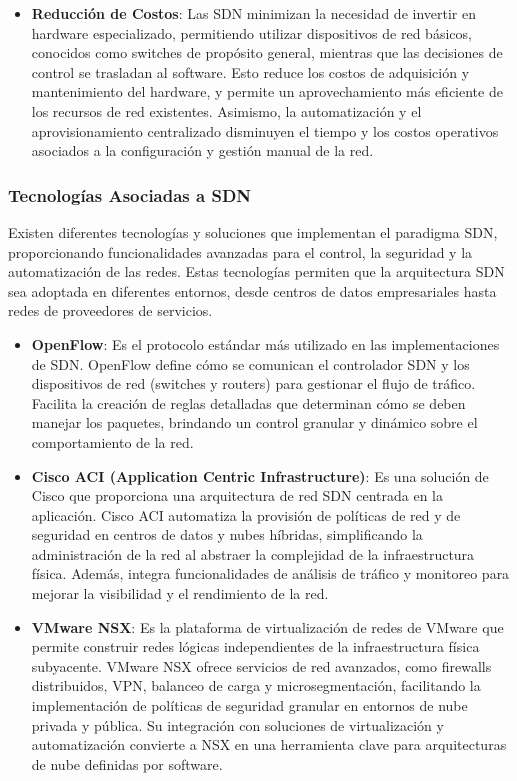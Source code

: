 {\begin{itemize}
                    \item \textbf{Reducción de Costos}: Las SDN minimizan la necesidad de invertir en hardware especializado, permitiendo utilizar dispositivos de red básicos, conocidos como switches de propósito general, mientras que las decisiones de control se trasladan al software. Esto reduce los costos de adquisición y mantenimiento del hardware, y permite un aprovechamiento más eficiente de los recursos de red existentes. Asimismo, la automatización y el aprovisionamiento centralizado disminuyen el tiempo y los costos operativos asociados a la configuración y gestión manual de la red.
                \end{itemize}
            
            \subsubsection{Tecnologías Asociadas a SDN}
                Existen diferentes tecnologías y soluciones que implementan el paradigma SDN, proporcionando funcionalidades avanzadas para el control, la seguridad y la automatización de las redes. Estas tecnologías permiten que la arquitectura SDN sea adoptada en diferentes entornos, desde centros de datos empresariales hasta redes de proveedores de servicios.
            
                \begin{itemize}
                    \item \textbf{OpenFlow}: Es el protocolo estándar más utilizado en las implementaciones de SDN. OpenFlow define cómo se comunican el controlador SDN y los dispositivos de red (switches y routers) para gestionar el flujo de tráfico. Facilita la creación de reglas detalladas que determinan cómo se deben manejar los paquetes, brindando un control granular y dinámico sobre el comportamiento de la red.
                    
                    \item \textbf{Cisco ACI (Application Centric Infrastructure)}: Es una solución de Cisco que proporciona una arquitectura de red SDN centrada en la aplicación. Cisco ACI automatiza la provisión de políticas de red y de seguridad en centros de datos y nubes híbridas, simplificando la administración de la red al abstraer la complejidad de la infraestructura física. Además, integra funcionalidades de análisis de tráfico y monitoreo para mejorar la visibilidad y el rendimiento de la red.
                    
                    \item \textbf{VMware NSX}: Es la plataforma de virtualización de redes de VMware que permite construir redes lógicas independientes de la infraestructura física subyacente. VMware NSX ofrece servicios de red avanzados, como firewalls distribuidos, VPN, balanceo de carga y microsegmentación, facilitando la implementación de políticas de seguridad granular en entornos de nube privada y pública. Su integración con soluciones de virtualización y automatización convierte a NSX en una herramienta clave para arquitecturas de nube definidas por software.
                \end{itemize}

}
